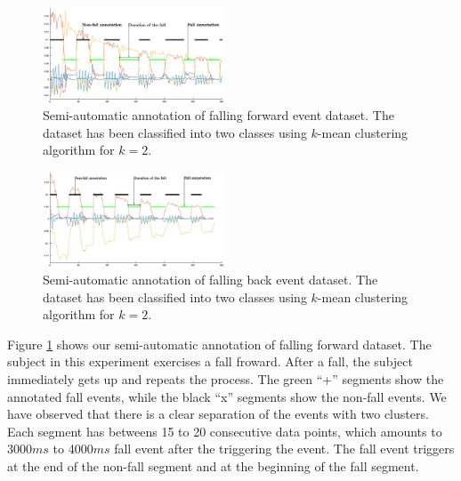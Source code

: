 \documentclass{IEEEtran}
\begin{document}
\begin{figure}[!htb]
\centering
\includegraphics[width=0.48\textwidth]{plots/human_falling_forward2.eps} 
\caption{Semi-automatic annotation of falling forward event dataset. The dataset has been classified into two classes using $k$-mean clustering algorithm for $k=2$.  }
 \label{fig:automatic_annotation} 
\end{figure}


\begin{figure}[!htb]
\centering
\includegraphics[width=0.48\textwidth]{plots/human_falling_backward2.eps} 
\caption{Semi-automatic annotation of falling back event dataset. The dataset has been classified into two classes using $k$-mean clustering algorithm for $k=2$.}
 \label{fig:automatic_annotation2} 
\end{figure}







Figure \ref{fig:automatic_annotation} shows our semi-automatic annotation of falling 
forward dataset. The subject in this experiment exercises a fall froward. After a 
fall, the subject immediately gets up and repeats the process. The green ``+'' segments 
show the annotated fall events, while the black ``x'' segments show the non-fall 
events. We have observed that there is a clear separation of the events with two 
clusters. Each segment has betweens 15 to 20 consecutive data points, which amounts to 
3000$ms$ to 4000$ms$ fall event after the triggering the event. The fall event triggers 
at the end of the non-fall segment and at the beginning of the fall segment.
\end{document}
